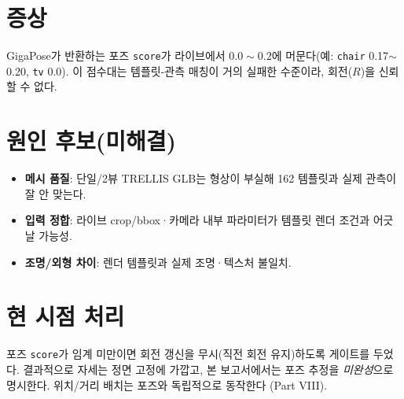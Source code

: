\section{증상}
GigaPose가 반환하는 포즈 \texttt{score}가 라이브에서 $0.0\sim0.2$에 머문다(예:
\texttt{chair} 0.17$\sim$0.20, \texttt{tv} 0.0). 이 점수대는 템플릿-관측 매칭이
거의 실패한 수준이라, 회전($R$)을 신뢰할 수 없다.

\section{원인 후보(미해결)}
\begin{itemize}
  \item \textbf{메시 품질}: 단일/2뷰 TRELLIS GLB는 형상이 부실해 162 템플릿과
        실제 관측이 잘 안 맞는다.
  \item \textbf{입력 정합}: 라이브 crop/bbox·카메라 내부 파라미터가 템플릿 렌더
        조건과 어긋날 가능성.
  \item \textbf{조명/외형 차이}: 렌더 템플릿과 실제 조명·텍스처 불일치.
\end{itemize}

\section{현 시점 처리}
포즈 \texttt{score}가 임계 미만이면 회전 갱신을 무시(직전 회전 유지)하도록
게이트를 두었다. 결과적으로 자세는 정면 고정에 가깝고, 본 보고서에서는 포즈
추정을 \emph{미완성}으로 명시한다. 위치/거리 배치는 포즈와 독립적으로 동작한다
(Part VIII).
